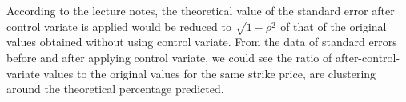According to the lecture notes, the theoretical value of the standard error after control variate is applied would be reduced to $\sqrt{1-\rho^2}$ of that of the original values obtained without using control variate. From the data of standard errors before and after applying control variate, we could see the ratio of after-control-variate values to the original values for the same strike price, are clustering around the theoretical percentage predicted.

